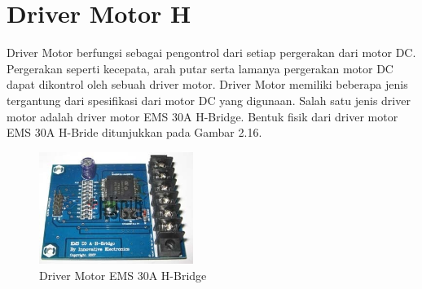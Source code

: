 \section{Driver Motor H}
Driver Motor berfungsi sebagai pengontrol dari setiap pergerakan dari motor DC. Pergerakan seperti kecepata, arah putar serta lamanya pergerakan motor DC dapat dikontrol oleh sebuah driver motor. Driver Motor memiliki beberapa jenis tergantung dari spesifikasi dari motor DC yang digunaan. Salah satu jenis driver motor adalah driver motor EMS 30A H-Bridge. Bentuk fisik dari driver motor EMS 30A H-Bride ditunjukkan pada Gambar 2.16.

	\begin{figure}[H]
	\centering
	\includegraphics[width=5cm]{gambar/driver_motor.jpg}
	\caption{Driver Motor EMS 30A H-Bridge}
	\end{figure}

